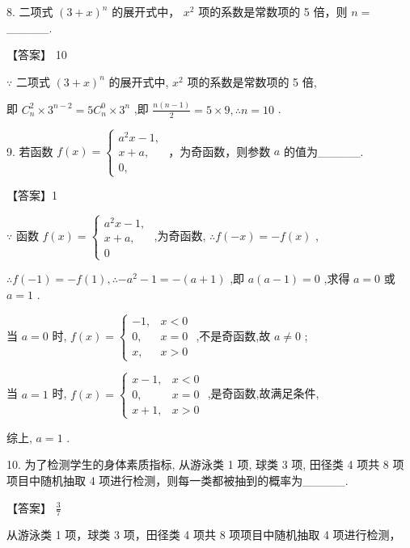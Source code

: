 \documentclass[10pt]{article}
\begin{document}
8. 二项式 \({\left( 3 + x\right) }^{n}\) 的展开式中， \({x}^{2}\) 项的系数是常数项的 5 倍，则 \(n =\) \_\_\_\_\_.

【答案】 10

\(\because\) 二项式 \({\left( 3 + x\right) }^{n}\) 的展开式中, \({x}^{2}\) 项的系数是常数项的 5 倍,

即 \({C}_{n}^{2} \times  {3}^{n - 2} = 5{C}_{n}^{0} \times  {3}^{n}\) ,即 \(\frac{n\left( {n - 1}\right) }{2} = 5 \times  9,\therefore n = {10}\) .

9. 若函数 \(f\left( x\right)  = \left\{  \begin{array}{l} {a}^{2}x - 1, \\  x + a, \\  0, \end{array}\right.\) ，为奇函数，则参数 \(a\) 的值为\_\_\_\_\_.

【答案】1

\(\because\) 函数 \(f\left( x\right)  = \left\{  \begin{array}{l} {a}^{2}x - 1, \\  x + a, \\  0 \end{array}\right.\) ,为奇函数, \(\therefore f\left( {-x}\right)  =  - f\left( x\right)\) ,

\(\therefore f\left( {-1}\right)  =  - f\left( 1\right) ,\therefore  - {a}^{2} - 1 =  - \left( {a + 1}\right)\) ,即 \(a\left( {a - 1}\right)  = 0\) ,求得 \(a = 0\) 或 \(a = 1\) .

当 \(a = 0\) 时, \(f\left( x\right)  = \left\{  \begin{array}{ll}  - 1, & x < 0 \\  0, & x = 0 \\  x, & x > 0 \end{array}\right.\) ,不是奇函数,故 \(a \neq  0\) ;

当 \(a = 1\) 时, \(f\left( x\right)  = \left\{  \begin{array}{ll} x - 1, & x < 0 \\  0, & x = 0 \\  x + 1, & x > 0 \end{array}\right.\) ,是奇函数,故满足条件,

综上, \(a = 1\) .

10. 为了检测学生的身体素质指标, 从游泳类 1 项, 球类 3 项, 田径类 4 项共 8 项项目中随机抽取 4 项进行检测，则每一类都被抽到的概率为\_\_\_\_\_.

【答案】 \(\frac{3}{7}\)

从游泳类 1 项，球类 3 项，田径类 4 项共 8 项项目中随机抽取 4 项进行检测，
\end{document}
